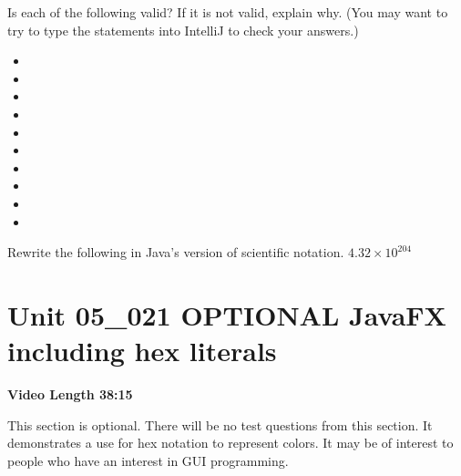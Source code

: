 \documentclass[letterpaper,12pt]{exam}
\newcommand{\unit}{Unit 05}
\begin{document}
\begin{questions}
\begin{samepage}
    \question Is each of the following valid?  If it is not valid, explain why.  (You may want to try to type the statements into IntelliJ to check your answers.)
      \begin{itemize}
        \item {} 
        \vspace{5mm}
        \item {} 
        \vspace{5mm}
        \item {} 
        \vspace{5mm}
        \item {} 
        \vspace{5mm}
        \item {}
        \vspace{5mm}
        \item {}
        \vspace{5mm}
        \item {} 
        \vspace{5mm}
        \item {} 
        \vspace{5mm}
        \item {}
        \vspace{5mm}
        \item {}
        \vspace{5mm}
    \end{itemize}
\end{samepage}




\begin{samepage}
    \question Rewrite the following in Java's version of scientific notation.  $4.32  \times  10^{204}$
    \vspace{5mm}
\end{samepage}



\section*{\unit\_021 OPTIONAL JavaFX including hex literals} %
\noindent \textbf{Video Length 38:15}

This section is optional.  There will be no test questions from this section. It demonstrates a use for hex notation to represent colors.  It may be of interest to people who have an interest in GUI programming.


\end{questions}
\end{document}
